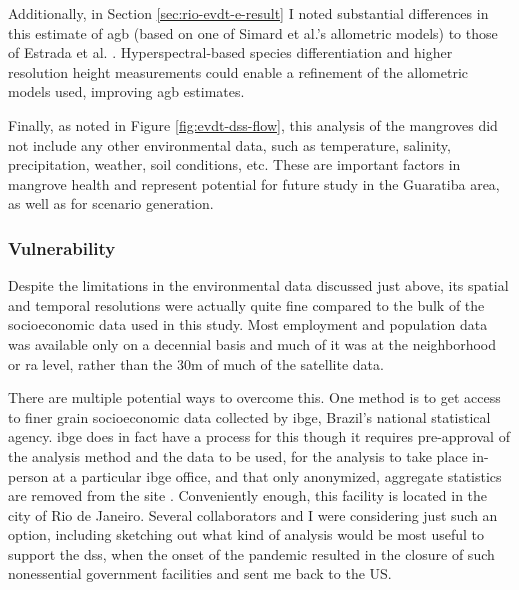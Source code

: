 Additionally, in Section \ref{sec:rio-evdt-e-result} I noted substantial differences in this estimate of \ac{agb} (based on one of Simard et al.'s allometric models) to those of Estrada et al. \cite{estradaEconomicEvaluationCarbon2015}. Hyperspectral-based species differentiation and higher resolution height measurements could enable a refinement of the allometric models used, improving \ac{agb} estimates. 

Finally, as noted in Figure \ref{fig:evdt-dss-flow}, this analysis of the mangroves did not include any other environmental data, such as temperature, salinity, precipitation, weather, soil conditions, etc. These are important factors in mangrove health and represent potential for future study in the Guaratiba area, as well as for scenario generation.

\subsubsection{Vulnerability}

Despite the limitations in the environmental data discussed just above, its spatial and temporal resolutions were actually quite fine compared to the bulk of the socioeconomic data used in this study. Most employment and population data was available only on a decennial basis and much of it was at the neighborhood or \ac{ra} level, rather than the 30m of much of the satellite data. 

There are multiple potential ways to overcome this. One method is to get access to finer grain socioeconomic data collected by \ac{ibge}, Brazil's national statistical agency. \ac{ibge} does in fact have a process for this though it requires pre-approval of the analysis method and the data to be used, for the analysis to take place in-person at a particular \ac{ibge} office, and that only anonymized, aggregate statistics are removed from the site \cite{institutobrasileirodegeografiaeestatisticaPedidosComoFazer2014}. Conveniently enough, this facility is located in the city of Rio de Janeiro. Several collaborators and I were considering just such an option, including sketching out what kind of analysis would be most useful to support the \ac{dss}, when the onset of the pandemic resulted in the closure of such nonessential government facilities and sent me back to the US. 


